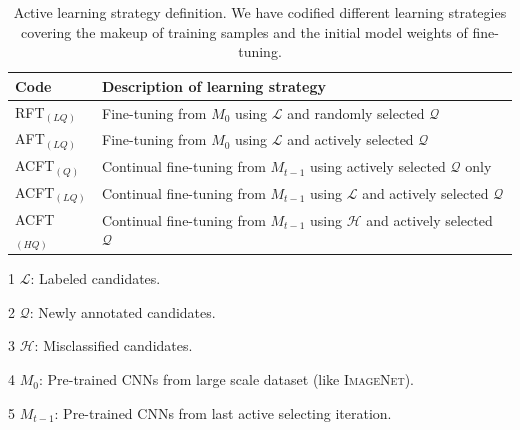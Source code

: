 \begin{table}[t]
\begin{center}
\begin{threeparttable}
\footnotesize
\caption[Abbreviation and Definition of Learning Strategies]{
Active learning strategy definition. We have codified different learning strategies covering the makeup of training samples and the initial model weights of fine-tuning.}
\label{ch3:tab:terminology}
    \begin{tabular}{p{}p{}}
    \hline
    \textbf{Code} & \textbf{Description of learning strategy} \\
    \hline
    RFT$_{(LQ)}$ & Fine-tuning from $M_{0}$ using $\mathcal{L}$ and randomly selected $\mathcal{Q}$ \\
    AFT$_{(LQ)}$ & Fine-tuning from $M_0$ using $\mathcal{L}$ and actively selected $\mathcal{Q}$ \\
    ACFT$_{(Q)}$ & Continual fine-tuning from $M_{t-1}$ using actively selected $\mathcal{Q}$ only \\
    ACFT$_{(LQ)}$ & Continual fine-tuning from $M_{t-1}$ using $\mathcal{L}$ and actively selected $\mathcal{Q}$ \\
    ACFT$_{(HQ)}$ & Continual fine-tuning from $M_{t-1}$ using $\mathcal{H}$ and actively selected $\mathcal{Q}$ \\
    \hline
    \end{tabular}
    \begin{tablenotes}
        \footnotesize
        \item[1] $\mathcal{L}$: Labeled candidates.
        \item[2] $\mathcal{Q}$: Newly annotated candidates.
        \item[3] $\mathcal{H}$: Misclassified candidates.
        \item[4] $M_0$: Pre-trained CNNs from large scale dataset (like \textsc{ImageNet}).
        \item[5] $M_{t-1}$: Pre-trained CNNs from last active selecting iteration.
    \end{tablenotes}
\end{threeparttable}
\end{center}
\end{table}



